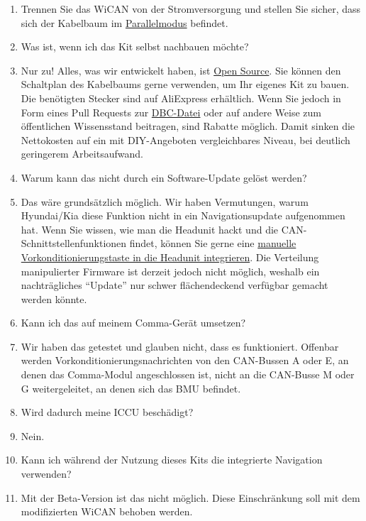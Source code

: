 \documentclass[superscriptaddress,onecolumn,floatfix]{revtex4-2}
\begin{document}
\begin{enumerate}
  \item[Antwort:] Trennen Sie das WiCAN von der Stromversorgung und stellen Sie sicher, dass sich der Kabelbaum im \href{https://github.com/tylerharvey/Ioniq5_CAN/blob/main/guides/harnesses/head_unit_MITM/MITM_harness_modes.pdf}{Parallelmodus} befindet.
  \item[Frage:] Was ist, wenn ich das Kit selbst nachbauen möchte?
  \item[Antwort:] Nur zu! Alles, was wir entwickelt haben, ist \href{https://github.com/tylerharvey/Ioniq5_CAN}{Open Source}. Sie können den Schaltplan des Kabelbaums gerne verwenden, um Ihr eigenes Kit zu bauen. Die benötigten Stecker sind auf AliExpress erhältlich. Wenn Sie jedoch in Form eines Pull Requests zur \href{https://github.com/dragz/egmpdbc}{DBC-Datei} oder auf andere Weise zum öffentlichen Wissensstand beitragen, sind Rabatte möglich. Damit sinken die Nettokosten auf ein mit DIY-Angeboten vergleichbares Niveau, bei deutlich geringerem Arbeitsaufwand.
  \item[Frage:] Warum kann das nicht durch ein Software-Update gelöst werden?
  \item[Antwort:] Das wäre grundsätzlich möglich. Wir haben Vermutungen, warum Hyundai/Kia diese Funktion nicht in ein Navigationsupdate aufgenommen hat. Wenn Sie wissen, wie man die Headunit hackt und die CAN-Schnittstellenfunktionen findet, können Sie gerne eine \href{https://www.reddit.com/r/KiaEV6/comments/1jdd56u/comment/mid9xie/}{manuelle Vorkonditionierungstaste in die Headunit integrieren}. Die Verteilung manipulierter Firmware ist derzeit jedoch nicht möglich, weshalb ein nachträgliches ``Update'' nur schwer flächendeckend verfügbar gemacht werden könnte.
  \item[Frage:] Kann ich das auf meinem Comma-Gerät umsetzen?
  \item[Antwort:] Wir haben das getestet und glauben nicht, dass es funktioniert. Offenbar werden Vorkonditionierungsnachrichten von den CAN-Bussen A oder E, an denen das Comma-Modul angeschlossen ist, nicht an die CAN-Busse M oder G weitergeleitet, an denen sich das BMU befindet.
  \item[Frage:] Wird dadurch meine ICCU beschädigt?
  \item[Antwort:] Nein.
  \item[Frage:] Kann ich während der Nutzung dieses Kits die integrierte Navigation verwenden?
  \item[Antwort:] Mit der Beta-Version ist das nicht möglich. Diese Einschränkung soll mit dem modifizierten WiCAN behoben werden.

\end{enumerate}
\end{document}
